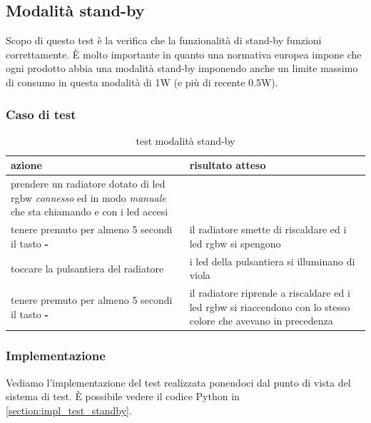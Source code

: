 \documentclass[12pt,a4paper,twoside,titlepage]{book}
\begin{document}
\subsection{Modalità stand-by}
\label{section:test_standby}

Scopo di questo test è la verifica che la funzionalità di stand-by funzioni correttamente.
È molto importante in quanto una normativa europea impone che ogni prodotto abbia una
modalità stand-by imponendo anche un limite massimo di consumo in questa modalità di 1W
(e più di recente 0.5W).

\subsubsection{Caso di test}

\begin{table}
    \centering
    \begin{tabular}{| p{} | p{} |}
        \hline 
        \textbf{azione} & \textbf{risultato atteso} \\ \hline
        prendere un radiatore dotato di \acrshort{led} \acrshort{rgbw} \textit{connesso} ed in modo \textit{manuale} che sta chiamando e con i \acrshort{led} accesi & \\ \hline
        tenere premuto per almeno 5 secondi il tasto \textbf{-} & il radiatore smette di riscaldare ed i \acrshort{led} \acrshort{rgbw} si spengono \\ \hline
        toccare la pulsantiera del radiatore & i \acrshort{led} della pulsantiera si illuminano di viola \\ \hline
        tenere premuto per almeno 5 secondi il tasto \textbf{-} & il radiatore riprende a riscaldare ed i \acrshort{led} \acrshort{rgbw} si riaccendono con lo stesso colore che avevano in precedenza \\ \hline
    \end{tabular}
    \caption{test modalità stand-by}
\end{table}

\subsubsection{Implementazione}
Vediamo l'implementazione del test realizzata ponendoci dal punto di vista del sistema di test. 
È possibile vedere il codice Python in \autoref{section:impl_test_standby}.
\end{document}
